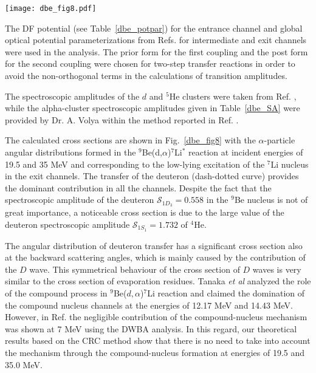\documentclass[
12pt, %
oneside, %
english, %
onehalfspacing, %
onehalfspacing, %
headsepline, %
]{MastersDoctoralThesis} %
\begin{document}
\begin{figure*}[tp]
\centering
\texttt{[image: dbe\_fig8.pdf]}
\decoRule
\caption{ \footnotesize Differential cross sections for the ${}^9$Be($d$,$\alpha$)${}^7$Li reactions measured at 19.5 MeV and 35 MeV energy with the ${}^{7}$Li observed in the ground or low-lying excited states in the exit channels.}
\label{dbe_fig8}
\end{figure*}	


The DF potential (see Table~\ref{dbe_potpar}) for the entrance channel and global optical potential parameterizations from Refs. \cite{globalTriton, globalAlpha, global6Li} for intermediate and exit channels were used in the analysis.
The prior form for the first coupling and the post form for the second coupling were chosen for two-step transfer reactions in order to avoid the non-orthogonal terms in the calculations of transition amplitudes.


The spectroscopic amplitudes of the $d$ and ${}^5$He clusters were taken from Ref. \cite{fiveSA}, while the alpha-cluster spectroscopic amplitudes given in Table~\ref{dbe_SA} were provided by Dr. A. Volya within the method reported in Ref. \cite{volya2017}.

The calculated cross sections are shown in Fig.~\ref{dbe_fig8} with the $\alpha$-particle angular distributions formed in the ${}^9$Be(d,$\alpha$)${}^7$Li$^*$ reaction at incident energies of 19.5 and 35 MeV and corresponding to the low-lying excitation of the ${}^7$Li nucleus in the exit channels. The transfer of the deuteron (dash-dotted curve) provides the dominant contribution in all the channels. Despite the fact that the spectroscopic amplitude of the deuteron $\mathcal{S}_{1{D}_3}=0.558$ in the ${}^9$Be nucleus is not of great importance, a noticeable cross section is due to the large value of the deuteron spectroscopic amplitude $\mathcal{S}_{1{S}_1}=1.732$  of ${}^4$He.

The angular distribution of deuteron transfer has a significant cross section also at the backward scattering angles, which is mainly caused by the contribution of the $D$ wave. This symmetrical behaviour of the cross section of $D$ waves is very similar to the cross section of evaporation residues. Tanaka \textit{et al} \cite{tanaka1978} analyzed the role of the compound process in ${}^9$Be($d,\alpha$)${}^7$Li reaction and claimed the domination of the compound nucleus channels at the energies of 12.17 MeV and 14.43 MeV. However, in Ref. \cite{bodek1989} the negligible contribution of the compound-nucleus mechanism was shown at 7 MeV using the DWBA analysis. In this regard, our theoretical results based on the CRC method show that there is no need to take into account the mechanism through the compound-nucleus formation at energies of 19.5 and 35.0 MeV.
\end{document}
